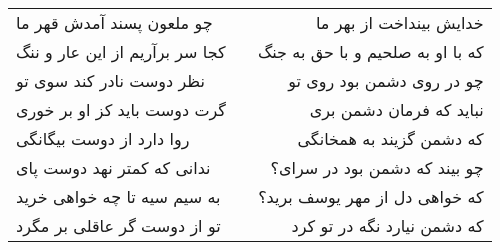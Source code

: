 \begin{center}
\begin{longtable}{l p{0.5cm} r}
چو ملعون پسند آمدش قهر ما
&&
خدایش بینداخت از بهر ما
\\
کجا سر برآریم از این عار و ننگ
&&
که با او به صلحیم و با حق به جنگ
\\
نظر دوست نادر کند سوی تو
&&
چو در روی دشمن بود روی تو
\\
گرت دوست باید کز او بر خوری
&&
نباید که فرمان دشمن بری
\\
روا دارد از دوست بیگانگی
&&
که دشمن گزیند به همخانگی
\\
ندانی که کمتر نهد دوست پای
&&
چو بیند که دشمن بود در سرای؟
\\
به سیم سیه تا چه خواهی خرید
&&
که خواهی دل از مهر یوسف برید؟
\\
تو از دوست گر عاقلی بر مگرد
&&
که دشمن نیارد نگه در تو کرد
\\
\end{longtable}
\end{center}
